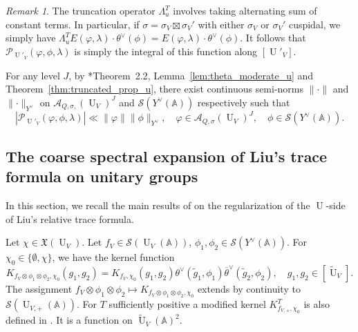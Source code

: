 \documentclass[letterpaper,11pt]{amsart}
\newcommand{\fX}{\mathfrak{X}}
\newcommand{\bA}{\mathbb{A}}
\newcommand{\cP}{\mathcal{P}}
\newcommand{\cS}{\mathcal{S}}
\newcommand{\<}{\negthickspace}
\providecommand{\aabs}[1]{\lVert#1\rVert}
\newcommand{\valP}[1]{\left|#1\right|}
\DeclareMathOperator{\U}{U}
\theoremstyle{definition}
\theoremstyle{plain}
\theoremstyle{remark}
\newtheorem{remark}[definition]{Remark}
\numberwithin{equation}{section}
\begin{document}
\begin{remark}
    \label{rem:cuspi_case}
    The truncation operator $\Lambda_u^T$ involves taking alternating sum of constant terms. In particular, if $\sigma=\sigma_V \boxtimes \sigma_V'$ with either $\sigma_V$ or $\sigma_V'$ cuspidal, we simply have $\Lambda_u^T E(\varphi,\lambda) \cdot \theta^\vee(\phi) =E(\varphi,\lambda)\cdot \theta^\vee(\phi) $. It follows that $\cP_{\U'_V}(\varphi,\phi,\lambda)$ is simply the integral of this function along $[\U'_V]$. 
\end{remark}


For any level $J$, by \cite{Lap}*{Theorem~2.2}, Lemma~\ref{lem:theta_moderate_u} and Theorem~\ref{thm:truncated_prop_u}, there exist continuous
semi-norms $\aabs{\cdot}$ and $\aabs{\cdot}_{Y^\vee}$ on
$\mathcal{A}_{Q,\sigma,}(\U_V)^J$ and $\cS(Y^\vee(\bA))$ respectively such
that
    \begin{equation}    \label{eq:cP_strong_continuity}
    \valP{\cP_{\U'_V}(\varphi,\phi,\lambda)} \ll \aabs{\varphi} \aabs{\phi}_{Y^\vee}, \quad \varphi \in \mathcal{A}_{Q,\sigma}(\U_V)^J, \quad \phi \in \cS(Y^\vee(\bA)).
    \end{equation}


\subsection[The coarse spectral expansion on unitary groups]{The coarse spectral expansion of Liu's trace formula on unitary groups}
\label{sec:coarse_spectral_u}

In this section, we recall the main results of \cite{BLX1} on the regularization of the $\U$-side of Liu's relative trace formula.

Let $\chi \in \fX(\U_V)$. Let $f_V \in \cS(\U_V(\bA))$, $\phi_1, \phi_2 \in \cS(Y^\vee(\bA))$. For $\chi_0 \in \{ \emptyset, \chi\}$, we have the kernel function
\begin{equation*}
    K_{f_V\otimes \phi_1 \otimes \phi_2,\chi_0}(g_1,g_2)=K_{f_V,\chi_0}(g_1,g_2) \theta^\vee(\widetilde{g}_1,\phi_1)\overline{\theta}^\vee(\widetilde{g}_2,\phi_2), \quad g_1,g_2 \in [\widetilde{\U}_V].
\end{equation*}
The assignment $f_V \otimes \phi_1 \otimes \phi_2 \mapsto K_{f_V\otimes \phi_1 \otimes \phi_2,\chi_0}$ extends by continuity to $\cS(\U_{V,+}(\bA))$. For $T$ sufficiently positive a modified kernel $K^T_{f_{V,+},\chi_0}$ is also defined in \cite[Section~7.3]{BLX1}. It is a function on $\widetilde{\U}_V(\bA)^2$.
\end{document}
